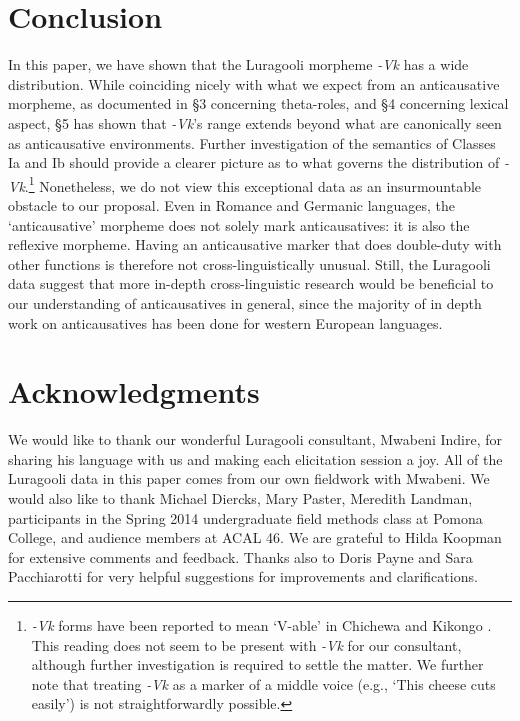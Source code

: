 \documentclass[output=paper]{langsci/langscibook}
\begin{document}
\section{Conclusion}

In this paper, we have shown that the Luragooli morpheme \textit{-Vk} has a wide distribution. While coinciding nicely with what we expect from an anticausative morpheme, as documented in §3 concerning theta-roles, and §4 concerning lexical aspect, §5 has shown that \textit{-Vk}’s range extends beyond what are canonically seen as anticausative environments. Further investigation of the semantics of Classes Ia and Ib should provide a clearer picture as to what governs the distribution of \textit{-Vk}.\footnote{ \textit{-Vk} forms have been reported to mean ‘V-able’ in Chichewa \citep{Simango2009} and Kikongo \citep{Fernando2013}. This reading does not seem to be present with \textit{-Vk} for our consultant, although further investigation is required to settle the matter. We further note that treating \textit{-Vk} as a marker of a middle voice (e.g., ‘This cheese cuts easily’) is not straightforwardly possible.} Nonetheless, we do not view this exceptional data as an insurmountable obstacle to our proposal. Even in Romance and Germanic languages, the ‘anticausative’ morpheme does not solely mark anticausatives: it is also the reflexive morpheme. Having an anticausative marker that does double-duty with other functions is therefore not cross-linguistically unusual. Still, the Luragooli data suggest that more in-depth cross-linguistic research would be beneficial to our understanding of anticausatives in general, since the majority of in depth work on anticausatives has been done for western European languages.

\section*{Acknowledgments}

We would like to thank our wonderful Luragooli consultant, Mwabeni Indire, for sharing his language with us and making each elicitation session a joy. All of the Luragooli data in this paper comes from our own fieldwork with Mwabeni. We would also like to thank Michael Diercks, Mary Paster, Meredith Landman, participants in the Spring 2014 undergraduate field methods class at Pomona College, and audience members at ACAL 46. We are grateful to Hilda Koopman for extensive comments and feedback. Thanks also to Doris Payne and Sara Pacchiarotti for very helpful suggestions for improvements and clarifications.
\end{document}
